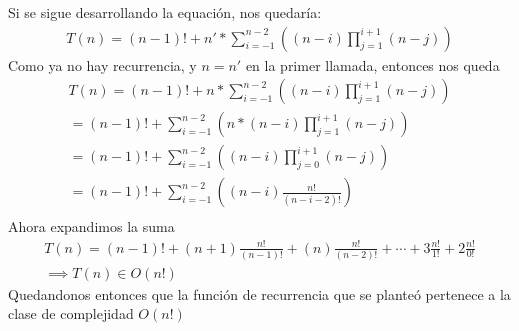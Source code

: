 Si se sigue desarrollando la equaci\'on, nos quedar\'ia:
\begin{equation*}
\begin{split}
T(n) = (n - 1)! + n'*\sum_{i=-1}^{n-2}((n-i)\prod_{j=1}^{i+1}(n-j))
\end{split}
\end{equation*}
Como ya no hay recurrencia, y $n = n'$ en la primer llamada, entonces nos queda
\begin{equation*}
\begin{split}
T(n) = (n - 1)! + n*\sum_{i=-1}^{n-2}((n-i)\prod_{j=1}^{i+1}(n-j)) \\
= (n - 1)! + \sum_{i=-1}^{n-2}(n*(n-i)\prod_{j=1}^{i+1}(n-j)) \\
= (n - 1)! + \sum_{i=-1}^{n-2}((n-i)\prod_{j=0}^{i+1}(n-j)) \\
= (n - 1)! + \sum_{i=-1}^{n-2}((n-i)\frac{n!}{(n-i-2)!}) \\
\end{split}
\end{equation*}
Ahora expandimos la suma
\begin{equation*}
\begin{split}
T(n) = (n - 1)! + (n + 1)\frac{n!}{(n-1)!} + (n)\frac{n!}{(n-2)!} + \cdots + 3\frac{n!}{1!} + 2\frac{n!}{0!} \\
\implies T(n) \in O(n!)
\end{split}
\end{equation*}
Quedandonos entonces que la funci\'on de recurrencia que se plante\'o pertenece a la clase de complejidad $O(n!)$

